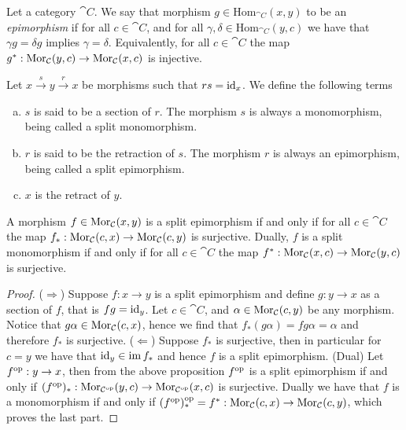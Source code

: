 \begin{definition}[Epimorphism]\label{def: epimorphism}
  Let a category \(\cat C\). We say that morphism \(g \in \mathrm{Hom}_{\cat
  C}(x, y)\) to be an \emph{epimorphism} if for all \(c \in \cat{C}\), and for
  all \(\gamma, \delta \in \mathrm{Hom}_{\cat C}(y, c)\) we have that \(\gamma g
  = \delta g\) implies \(\gamma = \delta\). Equivalently, for all \(c \in \cat
  C\) the map \(g^*: \operatorname{Mor}_{\mathcal C}(y, c)\to \operatorname{Mor}_{\mathcal C}(x, c)\) is injective.
\end{definition}

\begin{definition}
  Let \(x \xrightarrow s y \xrightarrow r x\) be morphisms such that \(r s =
  \operatorname{id}_x\). We define the following terms
  \begin{enumerate}[(a)]
    \item\label{def: split monomorphism}
      \(s\) is said to be a section of \(r\). The morphism \(s\) is always a
      monomorphism, being called a split monomorphism.
    \item\label{def: split epimorphism}
      \(r\) is said to be the retraction of \(s\). The morphism \(r\) is always
      an epimorphism, being called a split epimorphism.
    \item\label{def: retract}
      \(x\) is the retract of \(y\).
  \end{enumerate}
\end{definition}

\begin{proposition}
  A morphism \(f \in \operatorname{Mor}_{\mathcal C}(x, y)\) is a split epimorphism if and only if
  for all \(c \in \cat C\) the map \(f_*: \operatorname{Mor}_{\mathcal C}(c, x) \to \operatorname{Mor}_{\mathcal
    C}(c, y)\) is surjective. Dually, \(f\) is a split monomorphism if and only
    if for all \(c \in \cat C\) the map \(f^*: \operatorname{Mor}_{\mathcal C}(x, c) \to
    \operatorname{Mor}_{\mathcal C}(y, c)\) is surjective.
\end{proposition}

\begin{proof}
  (\(\Rightarrow\)) Suppose \(f: x \to y\) is a split epimorphism and define
  \(g: y \to x\) as a section of \(f\), that is \(f g = \operatorname{id}_y\). Let \(c
  \in \cat C\), and \(\alpha \in \operatorname{Mor}_{\mathcal C}(c, y)\) be any morphism. Notice
  that \(g \alpha \in \operatorname{Mor}_{\mathcal C}(c, x)\), hence we find that \(f_*(g
  \alpha) = f g \alpha = \alpha\) and therefore \(f_*\) is
  surjective. (\(\Leftarrow\)) Suppose \(f_*\) is surjective, then in particular
  for \(c = y\) we have that \(\operatorname{id}_y \in \operatorname{im} f_*\) and hence \(f\) is a split
  epimorphism. (Dual) Let \(f^{\mathrm{op}}: y \to x\), then from the above proposition
  \(f^{\mathrm{op}}\) is a split epimorphism if and only if \((f^{\mathrm{op}})_*: \operatorname{Mor}_{\mathcal
  C^{\mathrm{op}}}(y, c) \to \operatorname{Mor}_{\mathcal C^{\mathrm{op}}}(x, c)\) is surjective. Dually we have that
  \(f\) is a monomorphism if and only if \((f^{\mathrm{op}})_*^{\mathrm{op}} = f^*: \operatorname{Mor}_{\mathcal C}(c,
  x) \to \operatorname{Mor}_{\mathcal C}(c, y)\), which proves the last part.
\end{proof}

